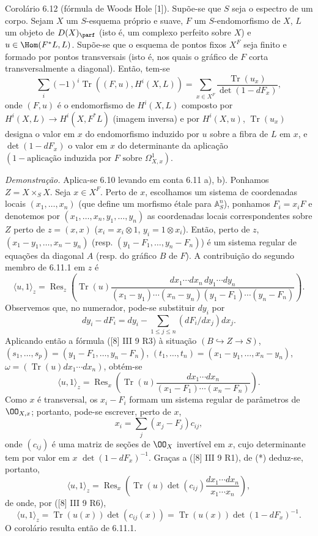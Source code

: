 \begin{statement}{Corolário 6.12}
(fórmula de Woods Hole [1]). Supõe-se que $S$ seja o espectro de um corpo. Sejam $X$ um $S$-esquema próprio e suave, $F$ um $S$-endomorfismo de $X$, $L$ um objeto de $D(X)_{\parf}$ (isto é, um complexo perfeito sobre $X$) e $u\in\Hom(F^*L,L)$. Supõe-se que o esquema de pontos fixos $X^F$ seja finito e formado por pontos transversais (isto é, nos quais o gráfico de $F$ corta transversalmente a diagonal). Então, tem-se
\[
\sum_i(-1)^i\operatorname{Tr}((F,u),H^i(X,L))=
\sum_{x\in X^F}\frac{\operatorname{Tr}(u_x)}{\det(1-dF_x)},
\]
onde $(F,u)$ é o endomorfismo de $H^i(X,L)$ composto por $H^i(X,L)\to H^i(X,F^*L)$ (imagem inversa) e por $H^i(X,u)$, $\operatorname{Tr}(u_x)$ designa o valor em $x$ do endomorfismo induzido por $u$ sobre a fibra de $L$ em $x$, e $\det(1-dF_x)$ o valor em $x$ do determinante da aplicação $(1-\text{aplicação induzida por }F\text{ sobre }\Omega^1_{X,x})$.

\emph{Demonstração.} Aplica-se 6.10 levando em conta 6.11 a), b). Ponhamos $Z=X\times_S X$. Seja $x\in X^F$. Perto de $x$, escolhamos um sistema de coordenadas locais $(x_1,\ldots,x_n)$ (que define um morfismo étale para $\mathbb A_S^n$), ponhamos $F_i=x_iF$ e denotemos por $(x_1,\ldots,x_n,y_1,\ldots,y_n)$ as coordenadas locais correspondentes sobre $Z$ perto de $z=(x,x)$ ($x_i=x_i\otimes1$, $y_i=1\otimes x_i$). Então, perto de $z$, $(x_1-y_1,\ldots,x_n-y_n)$ (resp. $(y_1-F_1,\ldots,y_n-F_n)$) é um sistema regular de equações da diagonal $A$ (resp. do gráfico $B$ de $F$). A contribuição do segundo membro de 6.11.1 em $z$ é
\[
\langle u,1\rangle_z=
\operatorname{Res}_z\left(\operatorname{Tr}(u)\frac{dx_1\cdots dx_n\,dy_1\cdots dy_n}{(x_1-y_1)\cdots(x_n-y_n)(y_1-F_1)\cdots(y_n-F_n)}\right).
\]
Observemos que, no numerador, pode-se substituir $dy_i$ por
\[
dy_i-dF_i=dy_i-\sum_{1\le j\le n}(dF_i/dx_j)dx_j.
\]
Aplicando então a fórmula ([8] III 9 R3) à situação $(B\hookrightarrow Z\to S)$, $(s_1,\ldots,s_p)=(y_1-F_1,\ldots,y_n-F_n)$, $(t_1,\ldots,t_n)=(x_1-y_1,\ldots,x_n-y_n)$, $\omega=(\operatorname{Tr}(u)dx_1\cdots dx_n)$, obtém-se
\begin{equation}
\tag{*}
\langle u,1\rangle_z=
\operatorname{Res}_x\left(\operatorname{Tr}(u)\frac{dx_1\cdots dx_n}{(x_1-F_1)\cdots(x_n-F_n)}\right).
\end{equation}
Como $x$ é transversal, os $x_i-F_i$ formam um sistema regular de parâmetros de $\OO_{X,x}$; portanto, pode-se escrever, perto de $x$,
\[
x_i=\sum_j(x_j-F_j)c_{ij},
\]
onde $(c_{ij})$ é uma matriz de seções de $\OO_X$ invertível em $x$, cujo determinante tem por valor em $x$ $\det(1-dF_x)^{-1}$. Graças a ([8] III 9 R1), de (*) deduz-se, portanto,
\[
\langle u,1\rangle_z=\operatorname{Res}_x\left(\operatorname{Tr}(u)\det(c_{ij})\frac{dx_1\cdots dx_n}{x_1\cdots x_n}\right),
\]
de onde, por ([8] III 9 R6),
\[
\langle u,1\rangle_z=\operatorname{Tr}(u(x))\det(c_{ij}(x))=\operatorname{Tr}(u(x))\det(1-dF_x)^{-1}.
\]
O corolário resulta então de 6.11.1.
\end{statement}

